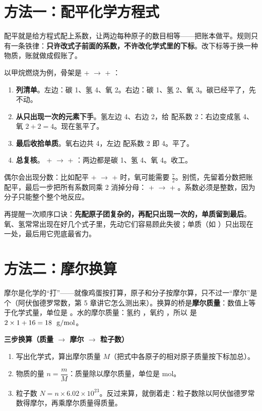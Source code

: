 \section{方法一：配平化学方程式}

配平就是给方程式配上系数，让两边每种原子的数目相等——把账本做平。规则只有一条铁律：\textbf{只许改式子前面的系数，不许改化学式里的下标}。改下标等于换一种物质，账就做成假账了。

以甲烷燃烧为例，骨架是  +  $\rightarrow$  + ：

\begin{enumerate}[itemsep=2pt]
\item \textbf{列清单}。左边：碳 1、氢 4、氧 2。右边：碳 1、氢 2、氧 3。碳已经平了，先不动。
\item \textbf{从只出现一次的元素下手}。氢左边 4、右边 2，给  配系数 2：右边变成氢 4、氧 $2+2=4$。现在氢平了。
\item \textbf{最后收拾单质}。氧右边共 4，左边  配系数 2 即 4。平了。
\item \textbf{总复核}。 +  $\rightarrow$  + ：两边都是碳 1、氢 4、氧 4。收工。
\end{enumerate}

偶尔会出现分数：比如配平  +  $\rightarrow$  +  时，氧可能需要 $\frac{7}{2}$。别慌，先留着分数把账配平，最后一步把所有系数同乘 2 消掉分母： +  $\rightarrow$  + 。系数必须是整数，因为分子只能整个整个地反应。

再提醒一次顺序口诀：\textbf{先配原子团复杂的，再配只出现一次的，单质留到最后}。氧、氢常常出现在好几个式子里，先动它们容易顾此失彼；单质（如 ）只出现在一处，最后用它兜底最省力。

\section{方法二：摩尔换算}

摩尔是化学的“打”——就像鸡蛋按打算，原子和分子按摩尔算，只不过一“摩尔”是  个（阿伏伽德罗常数，第 5 章讲它怎么测出来）。换算的桥是\textbf{摩尔质量}：数值上等于化学式量，单位是 。水的摩尔质量：氢约 ，氧约 ，所以  是 $2\times1+16=18\ \ \mathrm{g/mol}$。

\textbf{三步换算（质量 $\rightarrow$ 摩尔 $\rightarrow$ 粒子数）}

\begin{enumerate}[itemsep=2pt]
\item 写出化学式，算出摩尔质量 $M$（把式中各原子的相对原子质量按下标加总）。
\item 物质的量 $n = \dfrac{m}{M}$：质量除以摩尔质量，单位是 mol。
\item 粒子数 $N = n\times 6.02\times 10^{23}$。反过来算，就倒着走：粒子数除以阿伏伽德罗常数得摩尔，再乘摩尔质量得质量。
\end{enumerate}

